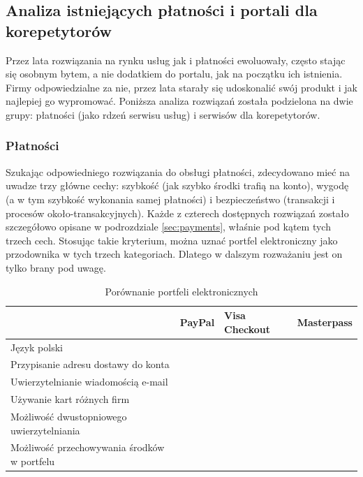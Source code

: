 \documentclass[12pt]{article}
\newcommand{\cmark}{\textcolor{green!80!black}{\ding{51}}}
\newcommand{\xmark}{\textcolor{red}{\ding{55}}}
\numberwithin{figure}{section}
\begin{document}
\begin{sloppypar}
\subsection{Analiza istniejących płatności i portali dla korepetytorów}
Przez lata rozwiązania na rynku usług jak i płatności ewoluowały, często stając się osobnym bytem, a nie dodatkiem do portalu, jak na początku ich istnienia. Firmy odpowiedzialne za nie, przez lata starały się udoskonalić swój produkt i jak najlepiej go wypromować. Poniższa analiza rozwiązań została podzielona na dwie grupy: płatności (jako rdzeń serwisu usług) i serwisów dla korepetytorów.

\subsubsection{Płatności}
Szukając odpowiedniego rozwiązania do obsługi płatności, zdecydowano mieć na uwadze trzy główne cechy: szybkość (jak szybko środki trafią na konto), wygodę (a w tym szybkość wykonania samej płatności) i bezpieczeństwo (transakcji i procesów około-transakcyjnych). Każde z czterech dostępnych rozwiązań zostało szczegółowo opisane w podrozdziale \ref{sec:payments}, właśnie pod kątem tych trzech cech. Stosując takie kryterium, można uznać portfel elektroniczny jako przodownika w tych trzech kategoriach. Dlatego w dalszym rozważaniu jest on tylko brany pod uwagę.

\begin{table}[H]
    \begin{tabular}{|p{5cm}|c|c|c|}
    \hline
     & \multicolumn{1}{l|}{\textbf{PayPal}} & \multicolumn{1}{l|}{\textbf{Visa Checkout}} & \multicolumn{1}{l|}{\textbf{Masterpass}} \\ \hline
    Język polski & \cmark & \cmark & \cmark \\ \hline
    Przypisanie adresu dostawy do konta & \cmark & \cmark & \cmark \\ \hline
    Uwierzytelnianie wiadomością e-mail & \cmark & \cmark & \xmark \\ \hline
    Używanie kart różnych firm & \cmark & \xmark & \xmark \\ \hline
    Możliwość dwustopniowego uwierzytelniania & \cmark & \xmark & \cmark \\ \hline
    Możliwość przechowywania środków w portfelu & \cmark & \xmark & \xmark \\ \hline
    \end{tabular}
    \caption{Porównanie portfeli elektronicznych}
    \label{tab:portfele}
\end{table}


\end{sloppypar}
\end{document}
